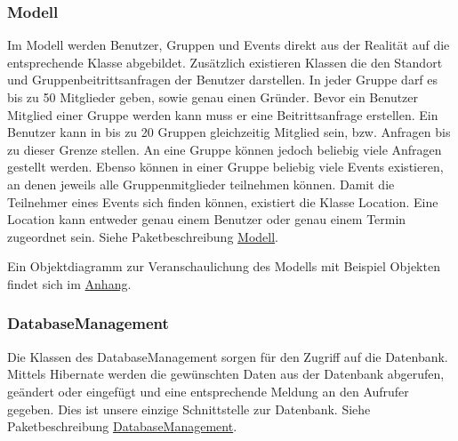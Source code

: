 	\subsubsection{Modell}
Im Modell werden Benutzer, Gruppen und Events direkt aus der Realität auf die entsprechende Klasse abgebildet. Zusätzlich existieren Klassen die den Standort und Gruppenbeitrittsanfragen der Benutzer darstellen.
In jeder Gruppe darf es bis zu 50 Mitglieder geben, sowie genau einen Gründer. Bevor ein Benutzer Mitglied einer Gruppe werden kann muss er eine Beitrittsanfrage erstellen.
Ein Benutzer kann in bis zu 20 Gruppen gleichzeitig Mitglied sein, bzw. Anfragen bis zu dieser Grenze stellen.
An eine Gruppe können jedoch beliebig viele Anfragen gestellt werden.
Ebenso können in einer Gruppe beliebig viele Events existieren, an denen jeweils alle Gruppenmitglieder teilnehmen können.
Damit die Teilnehmer eines Events sich finden können, existiert die Klasse Location. Eine Location kann entweder genau einem Benutzer oder genau einem Termin zugeordnet sein. 
\newline
Siehe Paketbeschreibung \hyperlink{database.model}{Modell}.
\newpage
\begin {center}
\end {center}
Ein Objektdiagramm zur Veranschaulichung des Modells mit Beispiel Objekten findet sich im \hyperlink{ModelExample}{Anhang}.

\newpage
	\subsubsection{DatabaseManagement}
	Die Klassen des DatabaseManagement sorgen für den Zugriff auf die Datenbank.
	Mittels Hibernate werden die gewünschten Daten aus der Datenbank abgerufen, geändert oder eingefügt und eine entsprechende Meldung an den Aufrufer gegeben.
	Dies ist unsere einzige Schnittstelle zur Datenbank.	
	\newline
Siehe Paketbeschreibung \hyperlink{database.management}{DatabaseManagement}.

